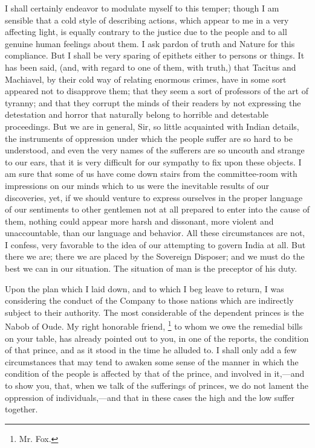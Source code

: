 I shall certainly endeavor to modulate myself to this temper; though I am sensible that a cold style of describing actions, which appear to me in a very affecting light, is equally contrary to the justice due to the people and to all genuine human feelings about them. I ask pardon of truth and Nature for this compliance. But I shall be very sparing of epithets either to persons or things. It has been said, (and, with regard to one of them, with truth,) that Tacitus and Machiavel, by their cold way of relating enormous crimes, have in some sort appeared not to disapprove them; that they seem a sort of professors of the art of tyranny; and that they corrupt the minds of their readers by not expressing the detestation and horror that naturally belong to horrible and detestable proceedings. But we are in general, Sir, so little acquainted with Indian details, the instruments of oppression under which the people suffer are so hard to be understood, and even the very names of the sufferers are so uncouth and strange to our ears, that it is very difficult for our sympathy to fix upon these objects. I am sure that some of us have come down stairs from the committee-room with impressions on our minds which to us were the inevitable results of our discoveries, yet, if we should venture to express ourselves in the proper language of our sentiments to other gentlemen not at all prepared to enter into the cause of them, nothing could appear more harsh and dissonant, more violent and unaccountable, than our language and behavior. All these circumstances are not, I confess, very favorable to the idea of our attempting to govern India at all. But there we are; there we are placed by the Sovereign Disposer; and we must do the best we can in our situation. The situation of man is the preceptor of his duty.

Upon the plan which I laid down, and to which I beg leave to return, I was considering the conduct of the Company to those nations which are indirectly subject to their authority. The most considerable of the dependent princes is the Nabob of Oude. My right honorable friend, 
\footnote{ Mr. Fox.}
 to whom we owe the remedial bills on your table, has already pointed out to you, in one of the reports, the condition of that prince, and as it stood in the time he alluded to. I shall only add a few circumstances that may tend to awaken some sense of the manner in which the condition of the people is affected by that of the prince, and involved in it,—and to show you, that, when we talk of the sufferings of princes, we do not lament the oppression of individuals,—and that in these cases the high and the low suffer together.

